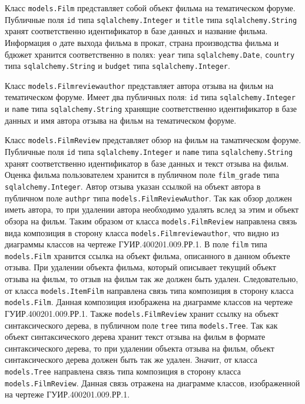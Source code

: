 Класс \texttt{models.Film} представляет собой объект фильма на тематическом форуме. Публичные поля \texttt{id} типа \texttt{sqlalchemy.Integer} и \texttt{title} типа \texttt{sqlalchemy.String} хранят соответственно идентификатор в базе данных и название фильма. Информация о дате выхода фильма в прокат, страна производства фильма и бдюжет хранится соответственно в полях: \texttt{year} типа \texttt{sqlalchemy.Date}, \texttt{country} типа \texttt{sqlalchemy.String} и \texttt{budget} типа \texttt{sqlalchemy.Integer}.

Класс \texttt{models.Filmreviewauthor} представляет автора отзыва на фильм на тематическом форуме. Имеет два публичных поля: \texttt{id} типа \texttt{sqlalchemy.Integer} и \texttt{name} типа \texttt{sqlalchemy.String} хранящие соответственно идентификатор в базе данных и имя автора отзыва на фильм на тематическом форуме.

Класс \texttt{models.FilmReview} представляет обзор на фильм на таматическом форуме. Публичные поля \texttt{id} типа \texttt{sqlalchemy.Integer} и \texttt{name} типа \texttt{sqlalchemy.String} хранят соответственно идентификатор в базе данных и текст отзыва на фильм. Оценка фильма пользователем хранится в публичном поле \texttt{film\_grade} типа \texttt{sqlalchemy.Integer}. Автор отзыва указан ссылкой на объект автора в публичном поле \texttt{authpr} типа \texttt{models.FilmReviewAuthor}. Так как обзор должен иметь автора, то при удалении автора необходимо удалять вслед за этим и объект обзора на фильм. Таким образом от класса \texttt{models.FilmReview} направлена связь вида композиция в сторону класса \texttt{models.Filmreviewauthor}, что видно из диаграммы классов на чертеже ГУИР.400201.009.РР.1. В поле \texttt{film} типа \texttt{models.Film} хранится ссылка на объект фильма, описанного в данном объекте отзыва. При удалении объекта фильма, который описывает текущий объект отзыва на фильм, то отзыв на фильм так же должен быть удален. Следовательно, от класса \texttt{models.ItemFilm} направлена связь типа композиция в сторону класса \texttt{models.Film}. Данная композиция изображена на диаграмме классов на чертеже ГУИР.400201.009.РР.1. Также \texttt{models.FilmReview} хранит ссылку на объект синтаксического дерева, в публичном поле \texttt{tree} типа \texttt{models.Tree}. Так как объект синтаксического дерева хранит текст отзыва на фильм в формате синтаксического дерева, то при удалении объекта отзыва на фильм, объект синтаксического дерева должен быть так же удален. Значит, от класса \texttt{models.Tree} направлена связь типа композиция в сторону класса \texttt{models.FilmReview}. Данная связь отражена на диаграмме классов, изображенной на чертеже ГУИР.400201.009.РР.1.

